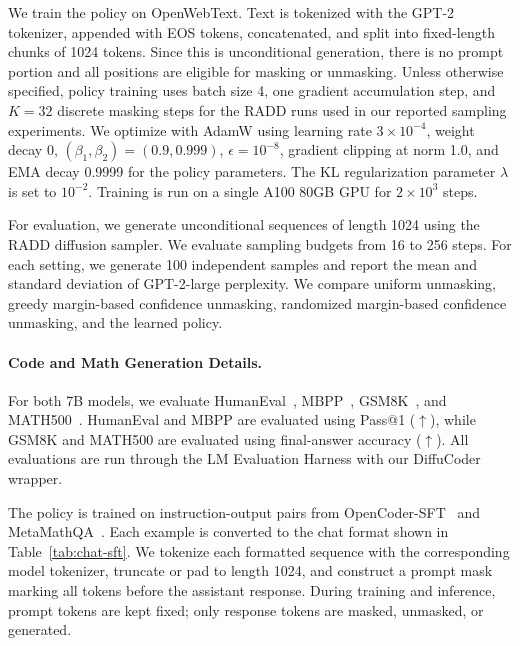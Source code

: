 We train the policy on OpenWebText. Text is tokenized with the GPT-2 tokenizer, appended with EOS tokens, concatenated, and split into fixed-length chunks of 1024 tokens. Since this is unconditional generation, there is no prompt portion and all positions are eligible for masking or unmasking. Unless otherwise specified, policy training uses batch size 4, one gradient accumulation step, and \(K=32\) discrete masking steps for the RADD runs used in our reported sampling experiments. We optimize with AdamW using learning rate \(3\times 10^{-4}\), weight decay 0, \((\beta_1,\beta_2)=(0.9,0.999)\), \(\epsilon=10^{-8}\), gradient clipping at norm 1.0, and EMA decay 0.9999 for the policy parameters. The KL regularization parameter $\lambda$ is set to $10^{-2}$. Training is run on a single A100 80GB GPU for $2\times10^3$ steps.

For evaluation, we generate unconditional sequences of length 1024 using the RADD diffusion sampler. We evaluate sampling budgets from 16 to 256 steps. For each setting, we generate 100 independent samples and report the mean and standard deviation of GPT-2-large perplexity. We compare uniform unmasking, greedy margin-based confidence unmasking, randomized margin-based confidence unmasking, and the learned policy.


\paragraph{Code and Math Generation Details.}

For both 7B models, we evaluate HumanEval~\citep{chen2021evaluatinglargelanguagemodels}, MBPP~\citep{austin2021programsynthesislargelanguage}, GSM8K~\citep{cobbe2021training}, and MATH500~\citep{lightman2023let}. HumanEval and MBPP are evaluated using Pass@1 ($\uparrow$), while GSM8K and MATH500 are evaluated using final-answer accuracy ($\uparrow$). All evaluations are run through the LM Evaluation Harness with our DiffuCoder wrapper.

The policy is trained on instruction-output pairs from OpenCoder-SFT~\citep{Gokaslan2019OpenWeb} and MetaMathQA~\citep{yu2023metamath}. Each example is converted to the chat format shown in Table~\ref{tab:chat-sft}. We tokenize each formatted sequence with the corresponding model tokenizer, truncate or pad to length 1024, and construct a prompt mask marking all tokens before the assistant response. During training and inference, prompt tokens are kept fixed; only response tokens are masked, unmasked, or generated.

